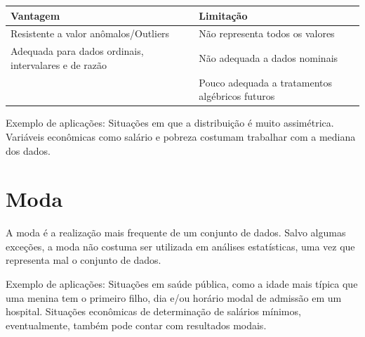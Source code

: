 \documentclass[
]{book}
\begin{document}
\begin{longtable}[]{@{}ll@{}}
\toprule
\begin{minipage}[b]{0.47\columnwidth}\raggedright
Vantagem\strut
\end{minipage} & \begin{minipage}[b]{0.47\columnwidth}\raggedright
Limitação\strut
\end{minipage}\tabularnewline
\midrule
\endhead
\begin{minipage}[t]{0.47\columnwidth}\raggedright
Resistente a valor anômalos/Outliers\strut
\end{minipage} & \begin{minipage}[t]{0.47\columnwidth}\raggedright
Não representa todos os valores\strut
\end{minipage}\tabularnewline
\begin{minipage}[t]{0.47\columnwidth}\raggedright
Adequada para dados ordinais, intervalares e de razão\strut
\end{minipage} & \begin{minipage}[t]{0.47\columnwidth}\raggedright
Não adequada a dados nominais\strut
\end{minipage}\tabularnewline
\begin{minipage}[t]{0.47\columnwidth}\raggedright
\strut
\end{minipage} & \begin{minipage}[t]{0.47\columnwidth}\raggedright
Pouco adequada a tratamentos algébricos futuros\strut
\end{minipage}\tabularnewline
\bottomrule
\end{longtable}

Exemplo de aplicações: Situações em que a distribuição é muito assimétrica. Variáveis econômicas como salário e pobreza costumam trabalhar com a mediana dos dados.

\hypertarget{moda}{%
\section{Moda}\label{moda}}

A moda é a realização mais frequente de um conjunto de dados. Salvo algumas exceções, a moda não costuma ser utilizada em análises estatísticas, uma vez que representa mal o conjunto de dados.

Exemplo de aplicações: Situações em saúde pública, como a idade mais típica que uma menina tem o primeiro filho, dia e/ou horário modal de admissão em um hospital. Situações econômicas de determinação de salários mínimos, eventualmente, também pode contar com resultados modais.
\end{document}
